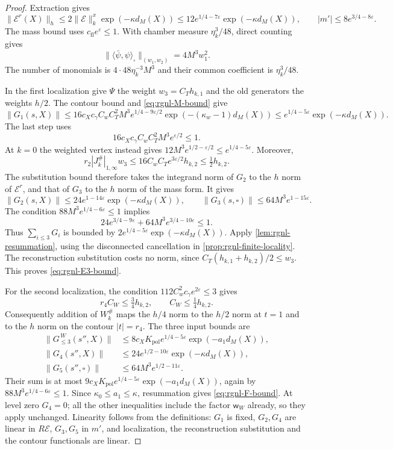 \begin{proof}
Extraction gives
\[
 \|\mathscr E^r(X)\|_h\le2\|\mathscr E\|_k^x\exp(-\kappa d_M(X))
                   \le12e^{1/4-7\varepsilon}\exp(-\kappa d_M(X)),
 \qquad |m'|\le8e^{3/4-8\varepsilon}.
\]
The mass bound uses
$c_{\mathrm{fl}}e^\varepsilon\le1$.
With chamber measure $\eta_k^3/48$, direct counting gives
\[
 \|\langle\bar\psi,\psi\rangle_\square\|_{(w_1,w_2)}
                                                    =4M^3w_1^2.
\]
The number of monomials is
$4\cdot48\eta_k^{-3}M^3$ and their common coefficient
is $\eta_k^3/48$.

In the first localization give $\Psi$ the weight
$w_3=C_Th_{k,1}$ and the old generators the weights $h/2$.
The contour bound and \eqref{eq:rgnl-M-bound} give
\[
 \|G_1(s,X)\|\le
 16c_Xc_\gamma C_wC_T^2M^3e^{1/4-9\varepsilon/2}
                 \exp(-(\kappa_w-1)d_M(X))
 \le e^{1/4-5\varepsilon}\exp(-\kappa d_M(X)).
\]
The last step uses
\[
 16c_Xc_\gamma C_wC_T^2M^3e^{\varepsilon/2}\le1.
\]
At $k=0$ the weighted vertex instead gives
$12M^3e^{1/2-\varepsilon/2}\le e^{1/4-5\varepsilon}$.
Moreover,
\[
 r_2|J_k^\#|_{1,\infty}w_3
     \le16C_wC_Te^{3\varepsilon/2}h_{k,2}
     \le\tfrac12h_{k,2}.
\]
The substitution bound therefore takes the integrand norm
of $G_2$ to the $h$ norm of $\mathscr E^r$, and that of
$G_3$ to the $h$ norm of the mass form. It gives
\[
 \|G_2(s,X)\|\le24e^{1-14\varepsilon}\exp(-\kappa d_M(X)),
 \qquad \|G_3(s,\square)\|\le64M^3e^{1-15\varepsilon}.
\]
The condition $88M^3e^{1/4-6\varepsilon}\le1$ implies
\[
 24e^{3/4-9\varepsilon}
                   +64M^3e^{3/4-10\varepsilon}\le1.
\]
Thus $\sum_{i\le3}G_i$ is bounded by
$2e^{1/4-5\varepsilon}\exp(-\kappa d_M(X))$.
Apply \cref{lem:rgnl-resummation}, using the disconnected
cancellation in \cref{prop:rgnl-finite-locality}.
The reconstruction substitution costs no norm, since
$C_T(h_{k,1}+h_{k,2})/2\le w_3$.
This proves \eqref{eq:rgnl-E3-bound}.

For the second localization, the condition
$112C_w^2c_\gamma e^{2\varepsilon}\le3$ gives
\[
 r_4C_W\le\tfrac34h_{k,2},\qquad C_W\le\tfrac14h_{k,2}.
\]
Consequently addition of $W_k^\#$ maps the $h/4$ norm
to the $h/2$ norm at $t=1$ and to the $h$ norm on
the contour $|t|=r_4$. The three input bounds are
\begin{align*}
 \|G_{\le3}^{\,W}(s'',X)\|
       &\le8c_XK_{\mathrm{pol}}e^{1/4-5\varepsilon}\exp(-a_1d_M(X)),\\
 \|G_4(s'',X)\|&\le24e^{1/2-10\varepsilon}\exp(-\kappa d_M(X)),\\
 \|G_5(s'',\square)\|&\le64M^3e^{1/2-11\varepsilon}.
\end{align*}
Their sum is at most
$9c_XK_{\mathrm{pol}}e^{1/4-5\varepsilon}\exp(-a_1d_M(X))$,
again by $88M^3e^{1/4-6\varepsilon}\le1$.
Since $\kappa_0\le a_1\le\kappa$, resummation gives
\eqref{eq:rgnl-F-bound}.
At level zero $G_4=0$; all the other inequalities include
the factor $\mathsf w_W$ already, so they apply unchanged.
Linearity follows from the definitions: $G_1$ is fixed,
$G_2,G_4$ are linear in $R\mathscr E$, $G_3,G_5$ in $m'$,
and localization, the reconstruction substitution and the
contour functionals are linear.
\end{proof}

